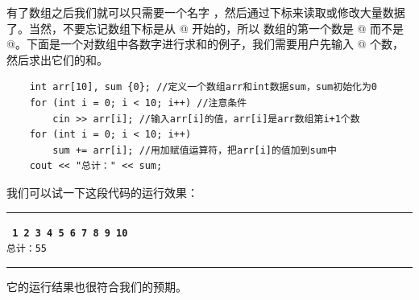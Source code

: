 有了数组之后我们就可以只需要一个名字 \lstinline@array@，然后通过下标来读取或修改大量数据了。当然，不要忘记数组下标是从 @ 开始的，所以 \lstinline@array@ 数组的第一个数是 \lstinline@array[0]@ 而不是 \lstinline@array[1]@。下面是一个对数组中各数字进行求和的例子，我们需要用户先输入 @ 个数，然后求出它们的和。
\begin{lstlisting}
    int arr[10], sum {0}; //定义一个数组arr和int数据sum，sum初始化为0
    for (int i = 0; i < 10; i++) //注意条件
        cin >> arr[i]; //输入arr[i]的值，arr[i]是arr数组第i+1个数
    for (int i = 0; i < 10; i++)
        sum += arr[i]; //用加赋值运算符，把arr[i]的值加到sum中
    cout << "总计：" << sum;
\end{lstlisting}
我们可以试一下这段代码的运行效果：\\\noindent\rule{\linewidth}{0.2pt}\texttt{
\textbf{1 2 3 4 5 6 7 8 9 10}\\
总计：55
}\\\noindent\rule{\linewidth}{0.2pt}
它的运行结果也很符合我们的预期。\par
